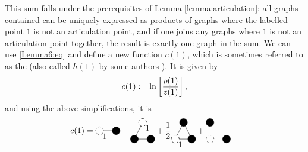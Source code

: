 \documentclass[8.5pt,twoside,twocolumn]{article}
\theoremstyle{standard}
\begin{document}
This sum falls under the prerequisites of Lemma \ref{lemma:articulation}: all graphs contained
can be uniquely expressed as products of graphs where the labelled point $1$ is not an articulation point, 
and if one joins any graphs where $1$ is not an articulation point together, the result is 
exactly one graph in the sum. We can use \eqref{Lemma6:eq} and define a new function $c(1)$,
which is sometimes referred to as the  (also called $h(1)$ by
some authors \cite{Stell}). It is given by
\begin{equation}
c(1):=\ln\left[\frac {\rho(1)} {z(1)}\right],
\label{TopRed:cDefi}
\end{equation}
and using the above simplifications, it is
\begin{equation}
\begin{aligned}
c(1)&=
\begin{tikzpicture}[baseline=-.1cm]%
  \draw(0,0) node[circle,minimum size=.2cm,dashed,draw] (A) {};
  \draw(.7,0) node[circle,minimum size=.2cm,draw,fill=black] (B) {};
  \draw (A.east) --  (B.center);
  \node [below right] at (A) {1};
\end{tikzpicture}
+
\begin{tikzpicture}[baseline=.25cm]
  \draw(0,0) node[circle,minimum size=.2cm,draw,fill=black] (A) {};
  \draw(.7,0) node[circle,minimum size=.2cm,draw,fill=black] (B) {};
  \draw(.35,.7) node[circle,minimum size=.2cm,dashed,draw] (C) {};
  \draw (A.center) --  (B.west);
  \draw (A.center) --  (C.center);
  \draw node[circle,minimum size=.2cm,draw,fill=white,dashed,opacity=1] at (C) {};
  \node [below right] at (C) {1};
\end{tikzpicture}
+ 
\frac 1 2
\begin{tikzpicture}[baseline=.25cm]
  \draw(0,0) node[circle,minimum size=.2cm,dashed,draw] (A) {};
  \draw(.7,0) node[circle,minimum size=.2cm,draw,fill=black] (B) {};
  \draw(.35,.7) node[circle,minimum size=.2cm,draw,fill=black] (C) {};
  \draw (A.center) --  (B.center);
  \draw (A.center) --  (C.center);
  \draw (B.center) --  (C.center);
  \draw node[circle,minimum size=.2cm,draw,dashed,fill=white,opacity=1] at (A) {};
  \node [below right] at (A) {1};
\end{tikzpicture}
 + 
 \begin{tikzpicture}[baseline=.25cm]
  \draw(0,0) node[circle,minimum size=.2cm,dashed,draw] (A) {};
  \draw(.7,0) node[circle,minimum size=.2cm,draw,fill=black] (B) {};
  \draw(0,.7) node[circle,minimum size=.2cm,draw,fill=black] (C) {};

\end{tikzpicture}
\end{aligned}
\end{equation}
\end{document}
